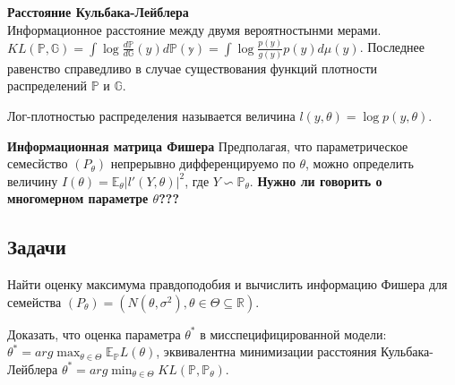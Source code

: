 \begin{definition} \textbf{Расстояние Кульбака-Лейблера}\\
Информационное расстояние между двумя вероятностынми мерами.\\
$KL(\mathbb{P}, \mathbb{G}) = \int \log \frac{d\mathbb{P}}{d\mathbb{G}}(y) d\mathbb{P(y)} = \int \log \frac{p(y)}{g(y)} p(y)d \mu (y)$. Последнее равенство справедливо в случае существования функций плотности распределений $\mathbb{P}$ и $\mathbb{G}$. 
\end{definition}

\begin{definition} Лог-плотностью распределения называется величина $l(y, \theta) = \log p(y, \theta)$.
\end{definition}

\begin{definition} \textbf{Информационная матрица Фишера}
Предполагая, что параметрическое семесйство $(P_{\theta})$ непрерывно дифференцируемо по $\theta$, можно определить величину $I(\theta) = \mathbb{E}_{\theta}|l'(Y, \theta)|^2$, где $Y \backsim \mathbb{P}_{\theta}$. \textbf{Нужно ли говорить о многомерном параметре $\theta$???}
\end{definition}

\subsection{Задачи}
\begin{problem} Найти оценку максимума правдоподобия и вычислить информацию Фишера для семейства $(P_{\theta}) = (N(\theta, \sigma^2), \theta \in \Theta \subseteq \mathbb{R})$.
\end{problem}

\begin{problem}
Доказать, что оценка параметра $\theta^*$ в мисспецифицированной модели: $\theta^* = arg\max_{\theta \in \Theta} \mathbb{E}_{\mathbb{P} }L(\theta)$, эквивалентна минимизации расстояния Кульбака-Лейблера $\theta^* = arg\min_{\theta \in \Theta} KL(\mathbb{P}, \mathbb{P_{\theta}})$.
\begin{ordre}

\end{ordre}

\end{problem}

